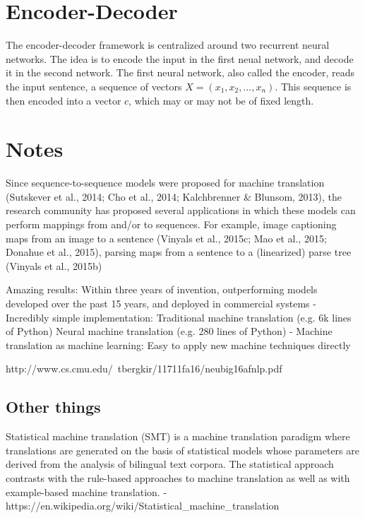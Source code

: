 
\section{Encoder-Decoder}
\label{sec:encoder-decoder}

The encoder-decoder framework is centralized around two recurrent neural networks. The idea is to encode the input in the first neual network, and decode it in the second network. The first neural network, also called the encoder, reads the input sentence, a sequence of vectors \(X = (x_{1}, x_{2}, ..., x_{n})\). This sequence is then encoded into a vector \(c\), which may or may not be of fixed length.

\iffalse
\section{Notes}


Since sequence-to-sequence models were proposed for machine translation (Sutskever et al., 2014; Cho et al., 2014; Kalchbrenner & Blunsom, 2013), the research community has proposed several applications in which these models can perform mappings from and/or to sequences. For example, image captioning maps from an image to a sentence (Vinyals et al., 2015c; Mao et al., 2015; Donahue et al., 2015), parsing maps from a sentence to a (linearized) parse tree (Vinyals et al., 2015b)

Amazing results:
Within three years of invention, outperforming models
developed over the past 15 years, and deployed in
commercial systems
- Incredibly simple implementation:
Traditional machine translation (e.g. 6k lines of Python)
Neural machine translation (e.g. 280 lines of Python)
- Machine translation as machine learning:
Easy to apply new machine techniques directly

http://www.cs.cmu.edu/~tbergkir/11711fa16/neubig16afnlp.pdf

\subsection{Other things}
Statistical machine translation (SMT) is a machine translation paradigm where translations are generated on the basis of statistical models whose parameters are derived from the analysis of bilingual text corpora. The statistical approach contrasts with the rule-based approaches to machine translation as well as with example-based machine translation. - https://en.wikipedia.org/wiki/Statistical\_machine\_translation



